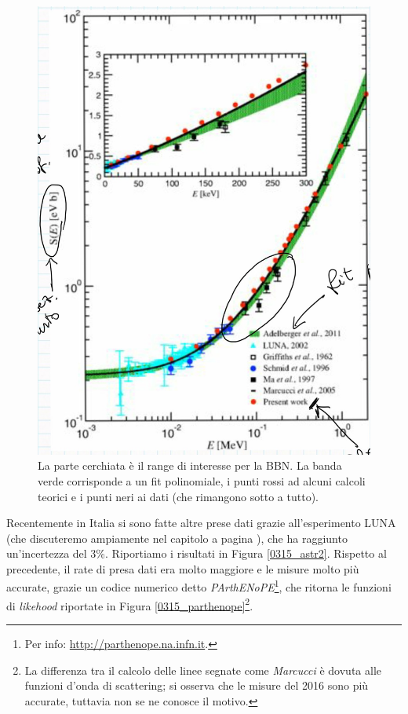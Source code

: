 \begin{figure}[h]
    \centering
    \includegraphics[scale=0.2]{Immagini/0315_fattoreastr.png}
    \caption{La parte cerchiata è il range di interesse per la BBN. La banda verde corrisponde a un fit polinomiale, i punti rossi ad alcuni calcoli teorici e i punti neri ai dati (che rimangono sotto a tutto).}
    \label{0315_astr}
\end{figure}
\newpage
\noindent Recentemente in Italia si sono fatte altre prese dati grazie all'esperimento LUNA (che discuteremo ampiamente nel capitolo a pagina ), che ha raggiunto un'incertezza del 3\%. Riportiamo i risultati in Figura \ref{0315_astr2}. Rispetto al precedente, il rate di presa dati era molto maggiore e le misure molto più accurate, grazie un codice numerico detto \textit{PArthENoPE}\footnote{Per info: \url{http://parthenope.na.infn.it}.}, che ritorna le funzioni di \textit{likehood} riportate in Figura \ref{0315_parthenope}\footnote{La differenza tra il calcolo delle linee segnate come \textit{Marcucci} è dovuta alle funzioni d'onda di scattering; si osserva che le misure del 2016 sono più accurate, tuttavia non se ne conosce il motivo.}.

